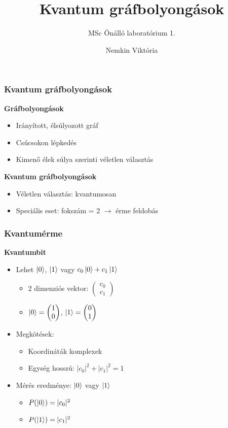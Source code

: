 \documentclass[aspectratio=169]{beamer}
\author{Nemkin Viktória}
\title{Kvantum gráfbolyongások}
\subtitle{MSc Önálló laboratórium 1.}
\date{}
\begin{document}
\frame{\titlepage}

\begin{frame}
  \frametitle{Kvantum gráfbolyongások}
  \textbf{Gráfbolyongások}
  \begin{itemize}
    \item Irányított, élsúlyozott gráf
    \item Csúcsokon lépkedés
    \item Kimenő élek súlya szerinti véletlen választás
  \end{itemize}
  \pause
  \textbf{Kvantum gráfbolyongások}
  \begin{itemize}
    \item Véletlen választás: kvantumosan
    \item Speciális eset: fokszám = 2 $\rightarrow$ érme feldobás
  \end{itemize}
\end{frame}

\begin{frame}
  \frametitle{Kvantumérme}
  \textbf{Kvantumbit}
  \begin{itemize}
    \item Lehet $\ket{0}$, $\ket{1}$ vagy $c_0\ket{0} + c_1\ket{1}$
          \begin{itemize}
            \item 2 dimenziós vektor: $\begin{pmatrix} c_0 \\ c_1 \end{pmatrix}$
            \item $\ket{0} = \begin{pmatrix} 1 \\ 0\end{pmatrix}$, $\ket{1} = \begin{pmatrix} 0 \\ 1\end{pmatrix}$
          \end{itemize}
          \pause
    \item Megkötések:
          \begin{itemize}
            \item Koordináták komplexek
            \item Egység hosszú: $|c_0|^2 + |c_1|^2 = 1$
          \end{itemize}
          \pause
    \item Mérés eredménye: $\ket{0}$ vagy $\ket{1}$
          \begin{itemize}
            \item $P(\ket{0}) = |c_0|^2$
            \item $P(\ket{1}) = |c_1|^2$
          \end{itemize}
  \end{itemize}
\end{frame}
\end{document}
